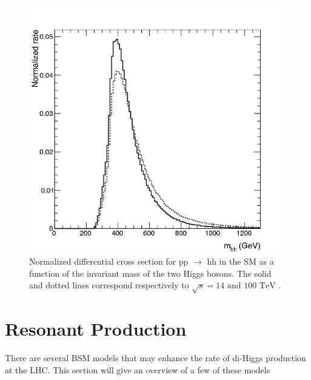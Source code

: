 \begin{figure}[h]
\begin{center}
\includegraphics[scale=0.3]{figures/SM_continuum}
\caption[Normalized di-Higgs cross section]{Normalized differential cross section for pp ${\rightarrow}$ hh in the SM as a function of the invariant mass of the two Higgs bosons. The solid and dotted lines correspond respectively to ${\sqrt{s} = 14 \text{ and } 100 \text{ TeV}}$ .\cite{azatov:2015}}
\label{fig:SM_cont}
\end{center}
\end{figure}


\section{Resonant Production}
There are several BSM models that may enhance the rate of di-Higgs production at the LHC. This section will give an overview of a few of these models

